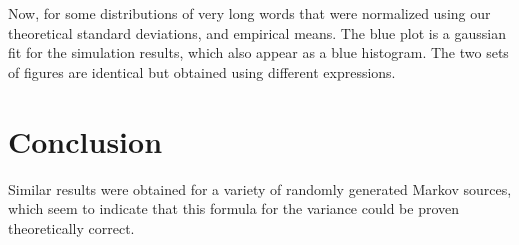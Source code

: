 
\pagebreak
Now, for some distributions of very long words that were normalized using 
our theoretical standard deviations, and empirical means. The blue plot is 
a gaussian fit for the simulation results, which also appear as a blue histogram.
The two sets of figures are identical but obtained using different expressions.




\section{Conclusion}
Similar results were obtained for a variety of randomly generated Markov sources,
which seem to indicate that this formula for the variance could be proven theoretically
correct. 

